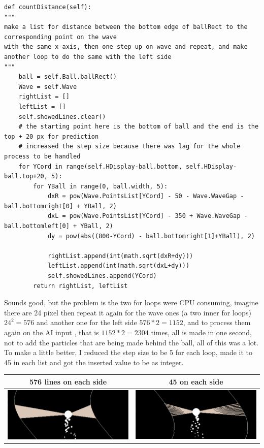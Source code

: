 \begin{listing}
	\begin{verbatim}
def countDistance(self):
"""
make a list for distance between the bottom edge of ballRect to the corresponding point on the wave 
with the same x-axis, then one step up on wave and repeat, and make another loop to do the same with the left side
"""
	ball = self.Ball.ballRect()
	Wave = self.Wave
	rightList = []
	leftList = []
	self.showedLines.clear()
	# the starting point here is the bottom of ball and the end is the top + 20 px for prediction
	# increased the step size because there was lag for the whole process to be handled
	for YCord in range(self.HDisplay-ball.bottom, self.HDisplay-ball.top+20, 5):
		for YBall in range(0, ball.width, 5):
			dxR = pow(Wave.PointsList[YCord] - 50 - Wave.WaveGap - ball.bottomright[0] + YBall, 2)
			dxL = pow(Wave.PointsList[YCord] - 350 + Wave.WaveGap - ball.bottomleft[0] + YBall, 2)
			dy = pow(abs((800-YCord) - ball.bottomright[1]+YBall), 2)

			rightList.append(int(math.sqrt(dxR+dy)))
			leftList.append(int(math.sqrt(dxL+dy)))
			self.showedLines.append(YCord)
		return rightList, leftList
	\end{verbatim}
\end{listing}

Sounds good, but the problem is the two for loops were CPU consuming, imagine there are 24 pixel then repeat it again for the wave ones (a two inner for loops) $24^2 = 576$ and another one for the left side $576*2 = 1152$,  and to process them again on the AI input , that is $1152*2 = 2304$ times, all is made in one second, not to add the particles that are being made behind the ball, all of this was a lot. To make a little better, I reduced the step size to be 5 for each loop, made it to 45 in each list and got the inserted value to be as integer.

\begin{table}[]
	\centering
\begin{tabular}{|c|c|}
	\hline
	576 lines on each side	& 45 on each side \\ \hline
		\includegraphics[width=0.5\linewidth]{"usedImages/vision 576 lines"}& \includegraphics[width=0.5\linewidth]{"usedImages/vision 45 lines"} \\ \hline
	\end{tabular}
\end{table}

